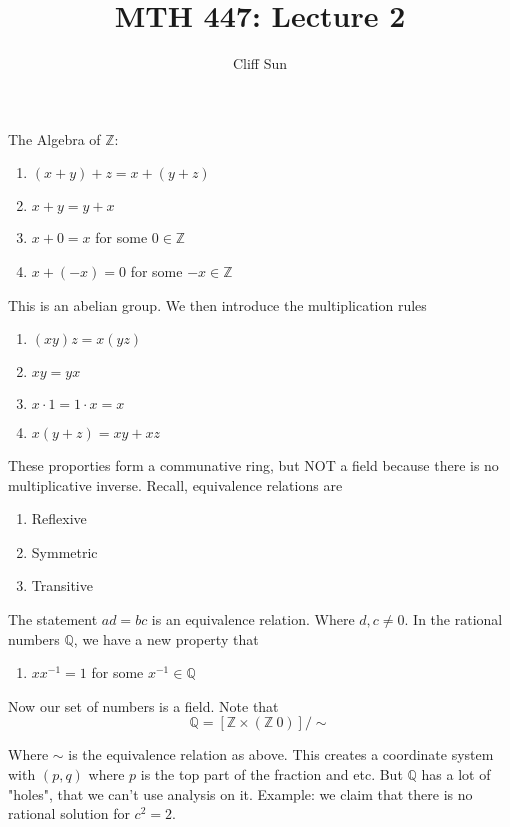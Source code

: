 \documentclass{article}
\title{MTH 447: Lecture 2}
\author{Cliff Sun}
\newtheorem{one minute paper}[theorem]{One Minute Paper}
\begin{document}
\maketitle

The Algebra of $\mathbb{Z}$:
\begin{enumerate}
    \item $(x+y) + z = x + (y+z)$
    \item $x + y = y + x$
    \item $x + 0 = x$ for some $0 \in \mathbb{Z}$
    \item $x + (-x) = 0$ for some $-x \in \mathbb{Z}$
\end{enumerate}

This is an abelian group. We then introduce the multiplication rules

\begin{enumerate}
    \item $(xy)z = x(yz)$
    \item $xy = yx$
    \item $x \cdot 1 = 1 \cdot x = x$
    \item $x(y+z) = xy + xz$
\end{enumerate}

These proporties form a communative ring, but NOT a field because there is no multiplicative inverse. Recall, equivalence relations are
\begin{enumerate}
    \item Reflexive
    \item Symmetric
    \item Transitive
\end{enumerate}

The statement $ad = bc$ is an equivalence relation. Where $d, c \neq 0$. In the rational numbers $\mathbb{Q}$, we have a new property that 
\begin{enumerate}
    \item $x x^{-1} =1$ for some $x^{-1} \in \mathbb{Q}$
\end{enumerate}

Now our set of numbers is a field. Note that 
\begin{equation}
    \mathbb{Q} = \left[\mathbb{Z} \times (\mathbb{Z} \ 0)\right] / \mathbb{\sim}
\end{equation}

Where $\sim$ is the equivalence relation as above. This creates a coordinate system with $(p,q)$ where $p$ is the top part of the fraction and etc. But $\mathbb{Q}$ has a lot of "holes", that 
we can't use analysis on it. Example: we claim that there is no rational solution for $c^2 = 2$. 
\end{document}
